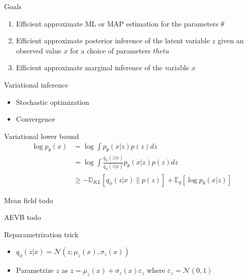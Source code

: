 \documentclass[unicode,11pt]{beamer}
\begin{document}
\begin{frame}[fragile]{Goals}
  \begin{enumerate}
    \item Efficient approximate ML or MAP estimation for the parameters $\theta$
    \item Efficient approximate posterior inference of the latent variable $z$ given an observed value $x$
for a choice of parameters $theta$
    \item Efficient approximate marginal inference of the variable $x$ 
  \end{enumerate}
\end{frame}

\begin{frame}[fragile]{Variational inference}
  \begin{itemize}
    \item Stochastic optimization
    \item Convergence
  \end{itemize}
\end{frame}


\begin{frame}[fragile]{Variational lower bound}
	\begin{align*} 
		\log {p_\theta (x)} &= \log \int {p_\theta (x|z) p(z) dz} \\
		&= \log \int{ \frac{q_\phi (z|x)}{q_\phi (z|x)} p_\theta (x|z) p(z) dz} \\
		&\ge -\mathbb{D}_{KL}[q_\phi (z|x) \parallel p(z)] + \mathbb{E}_q [\log p_\theta (x|z)]
	\end{align*} 

\end{frame}


\begin{frame}[fragile]{Mean field}
todo 
\end{frame}

\begin{frame}[fragile]{AEVB}
todo
\end{frame}

\begin{frame}[fragile]{Reparametrization trick}

\begin{itemize}
  \item $q_\phi(z|x) = \mathcal{N}(z; \mu_z(x), \sigma_z(x))$
  \item Parametrize $z$ as $z = \mu_z(x) + \sigma_z(x)\varepsilon_z$ where $\varepsilon_z = \mathcal{N}(0, 1)$ 
\end{itemize}

\end{frame}
\end{document}
